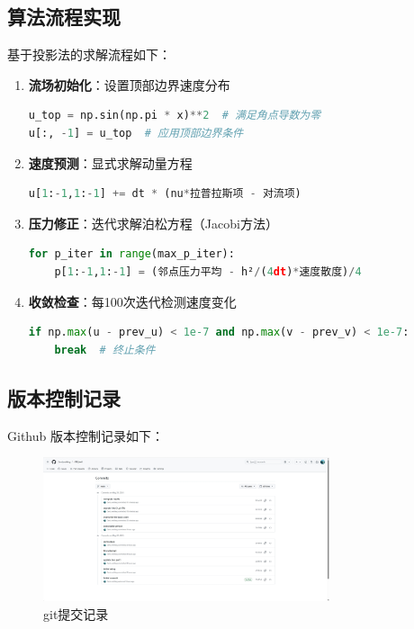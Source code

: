 \documentclass[UTF8]{ctexart}
\begin{document}
\subsection{算法流程实现}
基于投影法的求解流程如下：
\begin{enumerate}
    \item \textbf{流场初始化}：设置顶部边界速度分布
    \begin{lstlisting}[language=Python]
u_top = np.sin(np.pi * x)**2  # 满足角点导数为零
u[:, -1] = u_top  # 应用顶部边界条件
    \end{lstlisting}

    \item \textbf{速度预测}：显式求解动量方程
    \begin{lstlisting}[language=Python]
u[1:-1,1:-1] += dt * (nu*拉普拉斯项 - 对流项)
    \end{lstlisting}

    \item \textbf{压力修正}：迭代求解泊松方程（Jacobi方法）
    \begin{lstlisting}[language=Python]
for p_iter in range(max_p_iter):
    p[1:-1,1:-1] = (邻点压力平均 - h²/(4dt)*速度散度)/4
    \end{lstlisting}

    \item \textbf{收敛检查}：每100次迭代检测速度变化
    \begin{lstlisting}[language=Python]
if np.max(u - prev_u) < 1e-7 and np.max(v - prev_v) < 1e-7:
    break  # 终止条件
    \end{lstlisting}
\end{enumerate}


\subsection{版本控制记录}
Github 版本控制记录如下：
\begin{figure}[h]
    \centering
    \includegraphics[width=0.75\textwidth]{c1.png}
    \caption{git提交记录}
    \label{fig:commit}
\end{figure}
\end{document}
